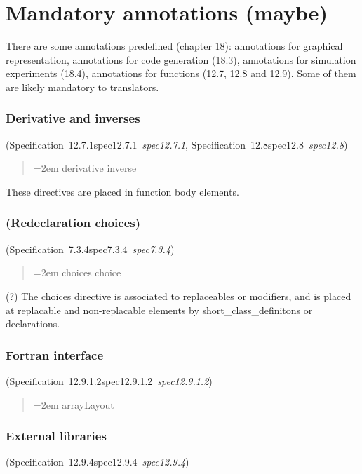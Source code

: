 \documentclass[10pt,b5paper]{article}
\def\specrefx#1#2{Specification~#1\ifx\relax#2\relax{}\else~{\it{}#2}\fi}
\def\specref#1{\specrefx{#1}{\csname spec#1\endcsname}}
\begin{document}

\section{Mandatory annotations (maybe)}

\def\quotespace{\spaceskip=2em%
\sloppy\hyphenpenalty=10000\exhyphenpenalty=10000}

There are some annotations predefined (chapter 18): annotations for
graphical representation, annotations for code generation (18.3),
annotations for simulation experiments (18.4), annotations for
functions (12.7, 12.8 and 12.9).  Some of them are likely mandatory to
translators.

\subsubsection*{Derivative and inverses}
(\specref{12.7.1}, \specref{12.8}\/)

\begin{quote}\spaceskip=2em
derivative
inverse
\end{quote}

These directives are placed in function body elements.

\subsubsection*{(Redeclaration choices)}
(\specref{7.3.4}\/)

\begin{quote}\spaceskip=2em
choices
choice
\end{quote}

(?) The choices directive is associated to replaceables or modifiers,
and is placed at replacable and non-replacable elements by
short_class_definitons or declarations.

\subsubsection*{Fortran interface}
(\specref{12.9.1.2}\/)

\begin{quote}\spaceskip=2em
arrayLayout
\end{quote}

\subsubsection*{External libraries}
(\specref{12.9.4}\/)
\end{document}
